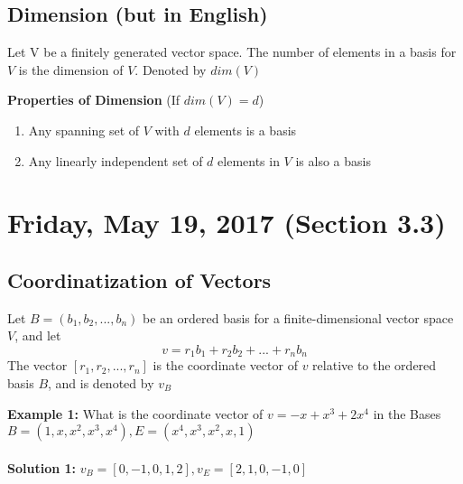 \documentclass[12pt]{article}
\begin{document}
\subsection{Dimension (but in English)}

\begin{tcolorbox}[title=Dimension]
	Let V be a finitely generated vector space. The number of elements in a basis for $V$ is the dimension of $V$. Denoted by $dim(V)$
\end{tcolorbox}

\textbf{Properties of Dimension} (If $dim(V) = d$)
\begin{enumerate}
	\item{Any spanning set of $V$ with $d$ elements is a basis}
	\item{Any linearly independent set of $d$ elements in $V$ is also a basis}
\end{enumerate}

\newpage

\section{Friday, May 19, 2017 (Section 3.3)}

\subsection{Coordinatization of Vectors}

\begin{tcolorbox}[title=Coordinate Vector of $V$ relative to the ordered basis $B$]
	Let $B = (b_1, b_2, ..., b_n)$	be an ordered basis for a finite-dimensional vector space $V$, and let
	$$v = r_1 b_1 + r_2 b_2 + ... + r_n b_n$$
	The vector $[r_1, r_2, ... , r_n]$ is the coordinate vector of $v$ relative to the ordered basis $B$, and is denoted by $v_B$
\end{tcolorbox}

\textbf{Example 1:} What is the coordinate vector of $v = -x + x^3 + 2x^4$ in the Bases $B = (1,x,x^2,x^3,x^4), E = (x^4, x^3, x^2, x, 1)$\\
\\
\textbf{Solution 1:} $v_B = [0, -1, 0 , 1, 2], v_E = [2,1,0,-1,0]$\\
\end{document}
